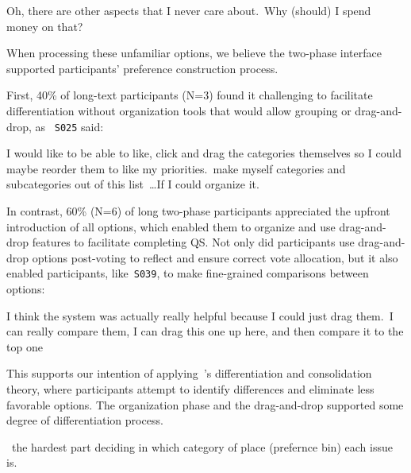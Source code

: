 \begin{displayquote}
Oh, there are other aspects that I never care about.~\bracketellipsis Why (should) I spend money on that? \\\hfill{}
\end{displayquote}

When processing these unfamiliar options, we believe the two-phase interface supported participants' preference construction process.

First, 40\% of long-text participants (N=3) found it challenging to facilitate differentiation without organization tools that would allow grouping or drag-and-drop, as ~\texttt{S025} said:

\begin{displayquote}
    I would like to be able to like, click and drag the categories themselves so I could maybe reorder them to like my priorities.~\bracketellipsis make myself categories and subcategories out of this list~\ldots If I could organize it. \hfill{}
\end{displayquote}

In contrast, 60\% (N=6) of long two-phase participants appreciated the upfront introduction of all options, which enabled them to organize and use drag-and-drop features to facilitate completing QS. Not only did participants use drag-and-drop options post-voting to reflect and ensure correct vote allocation, but it also enabled participants, like~\texttt{S039}, to make fine-grained comparisons between options:

\begin{displayquote}  
    I think the system was actually really helpful because I could just drag them.~\bracketellipsis I can really compare them, I can drag this one up here, and then compare it to the top one~\bracketellipsis \hfill{}  
\end{displayquote}  

This supports our intention of applying~\textcite{svensonDifferentiationConsolidationTheory1992}'s differentiation and consolidation theory, where participants attempt to identify differences and eliminate less favorable options. The organization phase and the drag-and-drop supported some degree of differentiation process.

\begin{displayquote}
    ~\bracketellipsis the hardest part deciding in which category of place (prefernce bin) each issue is. \hfill{}
\end{displayquote}

